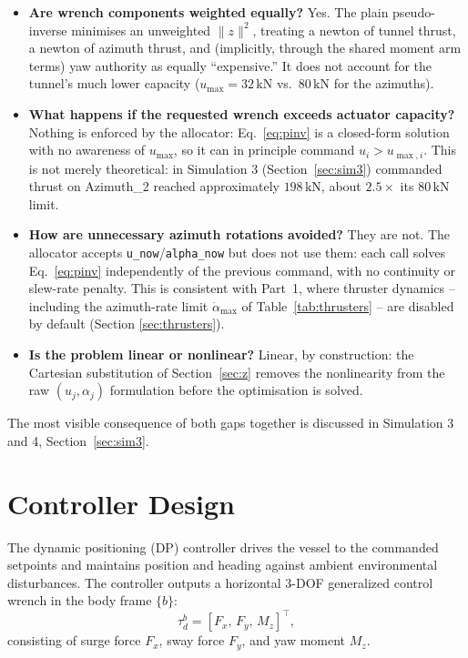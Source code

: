 \documentclass[10pt,conference]{IEEEtran}
\begin{document}
\begin{itemize}
\item \textbf{Are wrench components weighted equally?} Yes. The plain
pseudo-inverse minimises an unweighted $\|z\|^2$, treating a newton of
tunnel thrust, a newton of azimuth thrust, and (implicitly, through
the shared moment arm terms) yaw authority as equally ``expensive.''
It does not account for the tunnel's much lower capacity
($u_{\max}=32\,\mathrm{kN}$ vs.\ $80\,\mathrm{kN}$ for the azimuths).

\item \textbf{What happens if the requested wrench exceeds actuator
capacity?} Nothing is enforced by the allocator: Eq.~\eqref{eq:pinv}
is a closed-form solution with no awareness of $u_{\max}$, so it can
in principle command $u_i>u_{\max,i}$. This is not merely
theoretical: in Simulation 3 (Section~\ref{sec:sim3}) commanded
thrust on Azimuth\_2 reached approximately $198\,\mathrm{kN}$, about
$2.5\times$ its $80\,\mathrm{kN}$ limit.

\item \textbf{How are unnecessary azimuth rotations avoided?} They are
not. The allocator accepts \texttt{u\_now}/\texttt{alpha\_now} but
does not use them: each call solves Eq.~\eqref{eq:pinv} independently
of the previous command, with no continuity or slew-rate penalty.
This is consistent with Part~1, where thruster dynamics -- including
the azimuth-rate limit $\dot\alpha_{\max}$ of
Table~\ref{tab:thrusters} -- are disabled by default (Section
\ref{sec:thrusters}).

\item \textbf{Is the problem linear or nonlinear?} Linear, by
construction: the Cartesian substitution of
Section~\ref{sec:z} removes the nonlinearity from the raw
$(u_j,\alpha_j)$ formulation before the optimisation is solved.
\end{itemize}

The most visible consequence of both gaps together is discussed in
Simulation 3 and 4, Section~\ref{sec:sim3}.

\section{Controller Design}
\label{sec:controller}

The dynamic positioning (DP) controller drives the vessel to the commanded setpoints and maintains position and heading against ambient environmental disturbances. The controller outputs a horizontal 3-DOF generalized control wrench in the body frame $\{b\}$:
\begin{equation}
\tau_d^b = [F_x,\, F_y,\, M_z]^\top,
\end{equation}
consisting of surge force $F_x$, sway force $F_y$, and yaw moment $M_z$.
\end{document}
